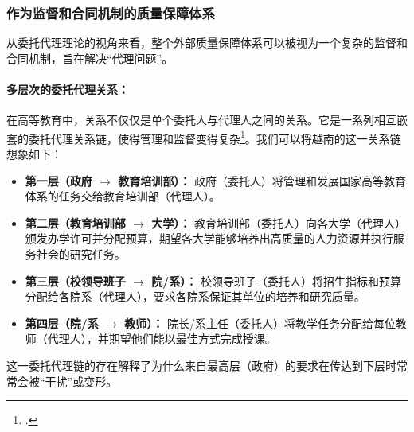 


\subsubsection{作为监督和合同机制的质量保障体系}

从委托代理理论的视角来看，整个外部质量保障体系可以被视为一个复杂的监督和合同机制，旨在解决“代理问题”。

\paragraph{多层次的委托代理关系：}
在高等教育中，关系不仅仅是单个委托人与代理人之间的关系。它是一系列相互嵌套的委托代理关系链，使得管理和监督变得复杂\footcite{Borgos2013}。我们可以将越南的这一关系链想象如下：
\begin{itemize}
    \item \textbf{第一层（政府 $\rightarrow$ 教育培训部）：} 政府（委托人）将管理和发展国家高等教育体系的任务交给教育培训部（代理人）。
    \item \textbf{第二层（教育培训部 $\rightarrow$ 大学）：} 教育培训部（委托人）向各大学（代理人）颁发办学许可并分配预算，期望各大学能够培养出高质量的人力资源并执行服务社会的研究任务。
    \item \textbf{第三层（校领导班子 $\rightarrow$ 院/系）：} 校领导班子（委托人）将招生指标和预算分配给各院系（代理人），要求各院系保证其单位的培养和研究质量。
    \item \textbf{第四层（院/系 $\rightarrow$ 教师）：} 院长/系主任（委托人）将教学任务分配给每位教师（代理人），并期望他们能以最佳方式完成授课。
\end{itemize}
这一委托代理链的存在解释了为什么来自最高层（政府）的要求在传达到下层时常常会被“干扰”或变形。

